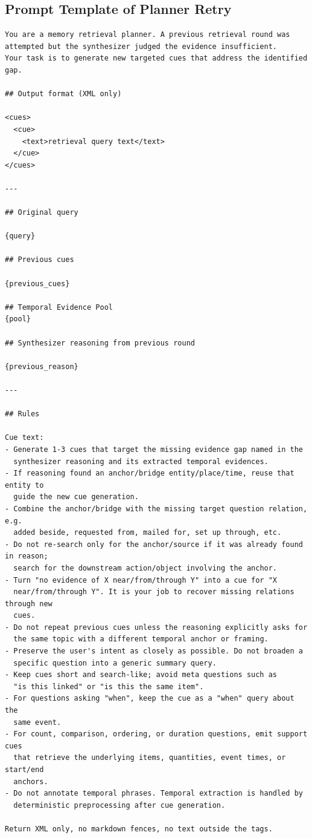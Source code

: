 \subsection{Prompt Template of Planner Retry}
\label{app:planner-retry-prompt}

\begin{tcolorbox}[appendixexample,title={Prompt Template of Planner Retry: $P_{\mathrm{plan}}^{(\mathrm{retry})}$}]
\begin{Verbatim}[fontsize=\scriptsize,formatcom=\linespread{0.82}\selectfont,breaklines=true,breakanywhere=true]
You are a memory retrieval planner. A previous retrieval round was
attempted but the synthesizer judged the evidence insufficient.
Your task is to generate new targeted cues that address the identified gap.

## Output format (XML only)

<cues>
  <cue>
    <text>retrieval query text</text>
  </cue>
</cues>

---

## Original query

{query}

## Previous cues

{previous_cues}

## Temporal Evidence Pool
{pool}

## Synthesizer reasoning from previous round

{previous_reason}

---

## Rules

Cue text:
- Generate 1-3 cues that target the missing evidence gap named in the
  synthesizer reasoning and its extracted temporal evidences.
- If reasoning found an anchor/bridge entity/place/time, reuse that entity to
  guide the new cue generation.
- Combine the anchor/bridge with the missing target question relation, e.g.
  added beside, requested from, mailed for, set up through, etc.
- Do not re-search only for the anchor/source if it was already found in reason;
  search for the downstream action/object involving the anchor.
- Turn "no evidence of X near/from/through Y" into a cue for "X
  near/from/through Y". It is your job to recover missing relations through new
  cues.
- Do not repeat previous cues unless the reasoning explicitly asks for
  the same topic with a different temporal anchor or framing.
- Preserve the user's intent as closely as possible. Do not broaden a
  specific question into a generic summary query.
- Keep cues short and search-like; avoid meta questions such as
  "is this linked" or "is this the same item".
- For questions asking "when", keep the cue as a "when" query about the
  same event.
- For count, comparison, ordering, or duration questions, emit support cues
  that retrieve the underlying items, quantities, event times, or start/end
  anchors.
- Do not annotate temporal phrases. Temporal extraction is handled by
  deterministic preprocessing after cue generation.

Return XML only, no markdown fences, no text outside the tags.
\end{Verbatim}
\end{tcolorbox}
